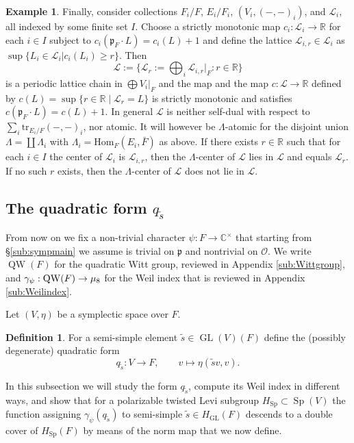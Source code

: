 \documentclass{article}
\def\mf#1{\mathfrak{#1}}
\def\mc#1{\mathcal{#1}}
\def\tx#1{\textrm{#1}}
\def\R{\mathbb{R}}
\def\cO{\mathcal{O}}
\newcommand{\bC}{\mathbb{C}}
\newcommand{\fp}{\mathfrak{p}}
\DeclareMathOperator{\Sp}{Sp}
\DeclareMathOperator{\GL}{GL}
\theoremstyle{definition}
\newtheorem{dfn}[thm]{Definition}
\newtheorem{exa}[thm]{Example}
\numberwithin{equation}{subsection}
\renewcommand{\-}{\hyp{}}
\DeclareMathOperator{\QW}{QW}
\begin{document}
\begin{exa}
Finally, consider collections $F_i/F$, $E_i/F_i$, $(V_i,(-,-)_i)$, and $\mc{L}_i$, all indexed by some finite set $I$. Choose a strictly monotonic map $c_i : \mc{L}_i \to \R$ for each $i \in I$ subject to $c_i(\mf{p}_F \cdot L)=c_i(L) + 1$  and define the lattice $\mc{L}_{i,r} \in \mc{L}_i$ as $\sup\{L_i \in \mc{L}_i| c_i(L_i) \geq r\}$. Then
\[ \mc{L}:=\Big\{\mc{L}_r := \bigoplus_i \mc{L}_{i,r}|_F: r \in \R \Big\} \]
is a periodic lattice chain in $\bigoplus V_i|_F$ and the map and the map $c : \mc{L} \to \R$ defined by $c(L)=\sup\{r\in\R\mid\mc{L}_r=L\}$ is strictly monotonic and satisfies $c(\mf{p}_F \cdot L)=c(L) + 1$. In general $\mc{L}$ is neither self-dual with respect to $\sum_i \tx{tr}_{E_i/F}(-,-)_i$, nor atomic. It will however be $\Lambda$-atomic for the disjoint union $\Lambda = \coprod \Lambda_i$ with $\Lambda_i=\tx{Hom}_F(E_i,\bar F)$ as above. If there exists $r \in \R$ such that for each $i \in I$ the center of $\mc{L}_i$ is $\mc{L}_{i,r}$, then the $\Lambda$-center of $\mc{L}$ lies in $\mc{L}$ and equals $\mc{L}_r$. If no such $r$ exists, then the $\Lambda$-center of $\mc{L}$ does not lie in $\mc{L}$.
\end{exa}



\subsection{\texorpdfstring{The quadratic form $q_{\tilde s}$}{}} \label{sub:qs}
From now on we fix a non-trivial character $\psi: F \to \bC^\times$ that starting from \S\ref{sub:sympmain} we assume is trivial on $\fp$ and nontrivial on $\cO$.
We write $\QW(F)$\index[notation]{QW@$\QW$} for the quadratic Witt group, reviewed in Appendix \ref{sub:Wittgroup}, and $\gamma_\psi:\QW(F) \ra \mu_8$ for the Weil index that is reviewed in Appendix \ref{sub:Weilindex}.

Let $(V,\eta)$ be a symplectic space over $F$. 

\begin{dfn} \label{dfn:qtildes}
	For a semi-simple element $\tilde s \in \GL(V)(F)$ define the (possibly degenerate) quadratic form
	\[ q_{\tilde s} : V \to F,\qquad v \mapsto \eta(\tilde sv,v). \]
\end{dfn}

In this subsection we will study the form $q_{\tilde s}$, compute its Weil index in different ways, and show that for a polarizable twisted Levi subgroup $H_{\Sp} \subset \Sp(V)$ the function assigning $\gamma_\psi(q_{\tilde s})$ to semi-simple $\tilde s \in H_{\GL}(F)$ descends to a double cover of $H_{\Sp}(F)$ by means of the norm map that we now define.
\end{document}
